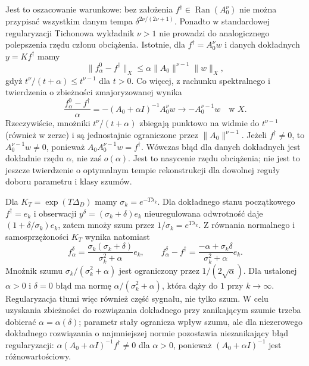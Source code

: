 \begin{uwaga}
Jest to oszacowanie warunkowe: bez założenia
$f^\dagger\in\operatorname{Ran}(A_0^\nu)$
nie można przypisać wszystkim danym tempa
$\delta^{2\nu/(2\nu+1)}$. Ponadto w standardowej
regularyzacji Tichonowa wykładnik $\nu>1$ nie
prowadzi do analogicznego polepszenia rzędu
członu obciążenia. Istotnie, dla
$f^\dagger=A_0^\nu w$ i danych dokładnych
$y=Kf^\dagger$ mamy
\[
 \|f_\alpha^0-f^\dagger\|_X
 \le\alpha\|A_0\|^{\nu-1}\|w\|_X,
\]
gdyż $t^\nu/(t+\alpha)\le t^{\nu-1}$
dla $t>0$. Co więcej, z rachunku spektralnego
i twierdzenia o zbieżności zmajoryzowanej wynika
\[
 \frac{f_\alpha^0-f^\dagger}{\alpha}
 =-(A_0+\alpha I)^{-1}A_0^\nu w
 \longrightarrow -A_0^{\nu-1}w
 \quad\text{w }X .
\]
Rzeczywiście, mnożniki $t^\nu/(t+\alpha)$
zbiegają punktowo na widmie do $t^{\nu-1}$
(również w zerze) i są jednostajnie ograniczone
przez $\|A_0\|^{\nu-1}$.
Jeżeli $f^\dagger\ne0$, to $A_0^{\nu-1}w\ne0$,
ponieważ $A_0 A_0^{\nu-1}w=f^\dagger$.
Wówczas błąd dla danych dokładnych jest dokładnie
rzędu $\alpha$, nie zaś $o(\alpha)$.
Jest to nasycenie rzędu obciążenia; nie jest to
jeszcze twierdzenie o optymalnym tempie rekonstrukcji
dla dowolnej reguły doboru parametru i klasy szumów.
\end{uwaga}

\begin{przyklad}
Dla $K_T=\exp(T\Delta_D)$ mamy
$\sigma_k=e^{-T\lambda_k}$. Dla dokładnego stanu początkowego $f^\dagger=e_k$
i obserwacji $y^\delta=(\sigma_k+\delta)e_k$
nieuregulowana odwrotność daje
$(1+\delta/\sigma_k)e_k$, zatem mnoży szum przez
$1/\sigma_k=e^{T\lambda_k}$.
Z równania normalnego i samosprzężoności $K_T$
wynika natomiast
\[
 f_\alpha^\delta
 =\frac{\sigma_k(\sigma_k+\delta)}
 {\sigma_k^2+\alpha}e_k,\qquad
 f_\alpha^\delta-f^\dagger
 =\frac{-\alpha+\sigma_k\delta}
 {\sigma_k^2+\alpha}e_k .
\]
Mnożnik szumu $\sigma_k/(\sigma_k^2+\alpha)$
jest ograniczony przez $1/(2\sqrt\alpha)$.
Dla ustalonej $\alpha>0$ i $\delta=0$ błąd ma normę
$\alpha/(\sigma_k^2+\alpha)$, która dąży do $1$
przy $k\to\infty$. Regularyzacja tłumi więc
również część sygnału, nie tylko szum. W celu uzyskania zbieżności do rozwiązania dokładnego przy
zanikającym szumie trzeba dobierać $\alpha=\alpha(\delta)$;
parametr stały ogranicza wpływ szumu, ale dla
niezerowego dokładnego rozwiązania o najmniejszej
normie pozostawia niezanikający błąd regularyzacji:
$\alpha(A_0+\alpha I)^{-1}f^\dagger\ne0$
dla $\alpha>0$, ponieważ $(A_0+\alpha I)^{-1}$
jest różnowartościowy.
\end{przyklad}

